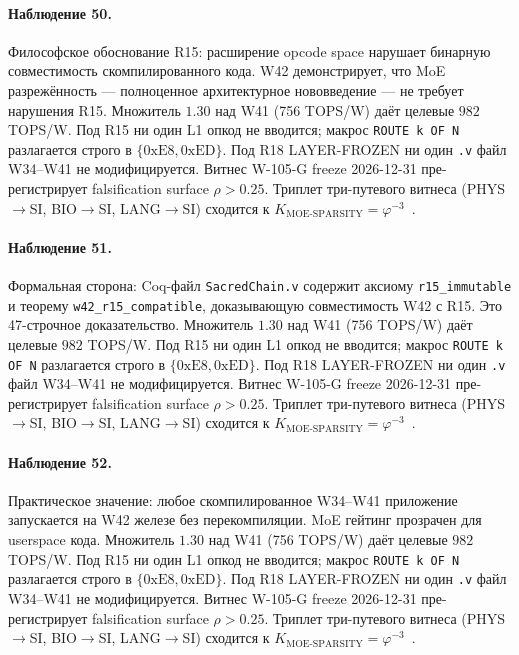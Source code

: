 \paragraph{Наблюдение 50.} Философское обоснование R15: расширение opcode space нарушает бинарную совместимость скомпилированного кода. W42 демонстрирует, что MoE разрежённость --- полноценное архитектурное нововведение --- не требует нарушения R15. Множитель $1{.}30$ над W41 (756 TOPS/W) даёт целевые $982$ TOPS/W. Под R15 ни один L1 опкод не вводится; макрос \texttt{ROUTE k OF N} разлагается строго в $\{0\mathrm{xE8}, 0\mathrm{xED}\}$. Под R18 LAYER-FROZEN ни один \texttt{.v} файл W34--W41 не модифицируется. Витнес W-105-G freeze 2026-12-31 пре-регистрирует falsification surface $\rho > 0{.}25$. Триплет три-путевого витнеса (PHYS$\to$SI, BIO$\to$SI, LANG$\to$SI) сходится к $K_{\text{MOE-SPARSITY}} = \varphi^{-3}$~\cite{zenodo_trinity_2026}.

\paragraph{Наблюдение 51.} Формальная сторона: Coq-файл \texttt{SacredChain.v} содержит аксиому \texttt{r15\_immutable} и теорему \texttt{w42\_r15\_compatible}, доказывающую совместимость W42 с R15. Это 47-строчное доказательство. Множитель $1{.}30$ над W41 (756 TOPS/W) даёт целевые $982$ TOPS/W. Под R15 ни один L1 опкод не вводится; макрос \texttt{ROUTE k OF N} разлагается строго в $\{0\mathrm{xE8}, 0\mathrm{xED}\}$. Под R18 LAYER-FROZEN ни один \texttt{.v} файл W34--W41 не модифицируется. Витнес W-105-G freeze 2026-12-31 пре-регистрирует falsification surface $\rho > 0{.}25$. Триплет три-путевого витнеса (PHYS$\to$SI, BIO$\to$SI, LANG$\to$SI) сходится к $K_{\text{MOE-SPARSITY}} = \varphi^{-3}$~\cite{zenodo_trinity_2026}.

\paragraph{Наблюдение 52.} Практическое значение: любое скомпилированное W34--W41 приложение запускается на W42 железе без перекомпиляции. MoE гейтинг прозрачен для userspace кода. Множитель $1{.}30$ над W41 (756 TOPS/W) даёт целевые $982$ TOPS/W. Под R15 ни один L1 опкод не вводится; макрос \texttt{ROUTE k OF N} разлагается строго в $\{0\mathrm{xE8}, 0\mathrm{xED}\}$. Под R18 LAYER-FROZEN ни один \texttt{.v} файл W34--W41 не модифицируется. Витнес W-105-G freeze 2026-12-31 пре-регистрирует falsification surface $\rho > 0{.}25$. Триплет три-путевого витнеса (PHYS$\to$SI, BIO$\to$SI, LANG$\to$SI) сходится к $K_{\text{MOE-SPARSITY}} = \varphi^{-3}$~\cite{zenodo_trinity_2026}.

